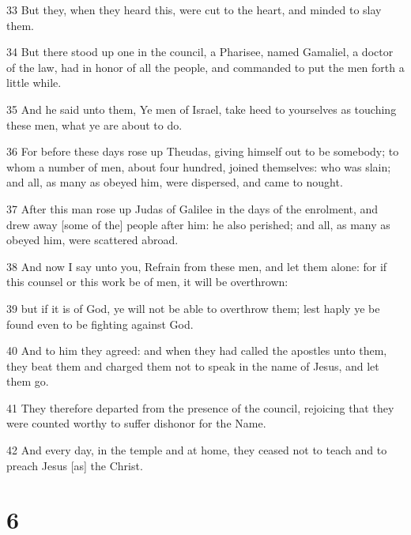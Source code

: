 \par 33 But they, when they heard this, were cut to the heart, and minded to slay them.
\par 34 But there stood up one in the council, a Pharisee, named Gamaliel, a doctor of the law, had in honor of all the people, and commanded to put the men forth a little while.
\par 35 And he said unto them, Ye men of Israel, take heed to yourselves as touching these men, what ye are about to do.
\par 36 For before these days rose up Theudas, giving himself out to be somebody; to whom a number of men, about four hundred, joined themselves: who was slain; and all, as many as obeyed him, were dispersed, and came to nought.
\par 37 After this man rose up Judas of Galilee in the days of the enrolment, and drew away [some of the] people after him: he also perished; and all, as many as obeyed him, were scattered abroad.
\par 38 And now I say unto you, Refrain from these men, and let them alone: for if this counsel or this work be of men, it will be overthrown:
\par 39 but if it is of God, ye will not be able to overthrow them; lest haply ye be found even to be fighting against God.
\par 40 And to him they agreed: and when they had called the apostles unto them, they beat them and charged them not to speak in the name of Jesus, and let them go.
\par 41 They therefore departed from the presence of the council, rejoicing that they were counted worthy to suffer dishonor for the Name.
\par 42 And every day, in the temple and at home, they ceased not to teach and to preach Jesus [as] the Christ.

\chapter{6}

